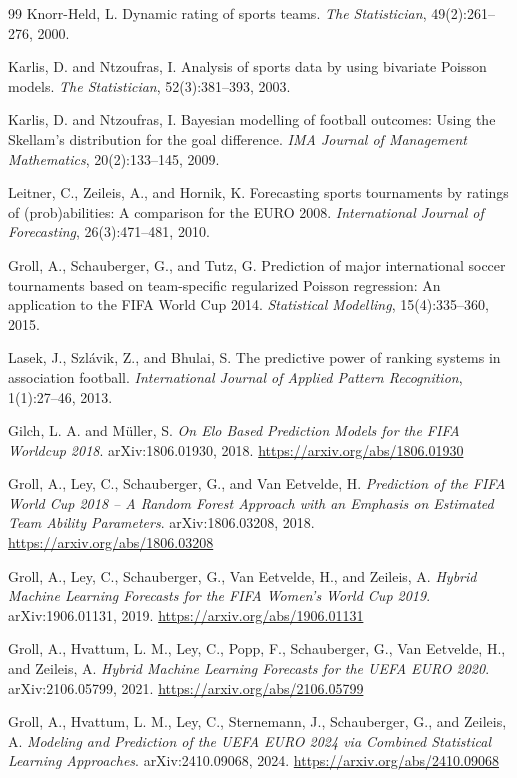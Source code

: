 \documentclass[11pt]{article}
\begin{document}
\begin{thebibliography}{99}
Knorr-Held, L. Dynamic rating of sports teams. \emph{The Statistician},
49(2):261--276, 2000.

Karlis, D. and Ntzoufras, I. Analysis of sports data by using bivariate Poisson
models. \emph{The Statistician}, 52(3):381--393, 2003.

Karlis, D. and Ntzoufras, I. Bayesian modelling of football outcomes: Using the
Skellam's distribution for the goal difference. \emph{IMA Journal of Management
Mathematics}, 20(2):133--145, 2009.

Leitner, C., Zeileis, A., and Hornik, K. Forecasting sports tournaments by
ratings of (prob)abilities: A comparison for the EURO 2008. \emph{International
Journal of Forecasting}, 26(3):471--481, 2010.

Groll, A., Schauberger, G., and Tutz, G. Prediction of major international
soccer tournaments based on team-specific regularized Poisson regression: An
application to the FIFA World Cup 2014. \emph{Statistical Modelling},
15(4):335--360, 2015.

Lasek, J., Szl\'avik, Z., and Bhulai, S. The predictive power of ranking systems
in association football. \emph{International Journal of Applied Pattern
Recognition}, 1(1):27--46, 2013.

Gilch, L. A. and M{\"u}ller, S. \emph{On Elo Based Prediction Models for the
FIFA Worldcup 2018}. arXiv:1806.01930, 2018.
\url{https://arxiv.org/abs/1806.01930}

Groll, A., Ley, C., Schauberger, G., and Van Eetvelde, H. \emph{Prediction of
the FIFA World Cup 2018 -- A Random Forest Approach with an Emphasis on
Estimated Team Ability Parameters}. arXiv:1806.03208, 2018.
\url{https://arxiv.org/abs/1806.03208}

Groll, A., Ley, C., Schauberger, G., Van Eetvelde, H., and Zeileis, A.
\emph{Hybrid Machine Learning Forecasts for the FIFA Women's World Cup 2019}.
arXiv:1906.01131, 2019.
\url{https://arxiv.org/abs/1906.01131}

Groll, A., Hvattum, L. M., Ley, C., Popp, F., Schauberger, G.,
Van Eetvelde, H., and Zeileis, A.
\emph{Hybrid Machine Learning Forecasts for the UEFA EURO 2020}.
arXiv:2106.05799, 2021.
\url{https://arxiv.org/abs/2106.05799}

Groll, A., Hvattum, L. M., Ley, C., Sternemann, J., Schauberger, G.,
and Zeileis, A.
\emph{Modeling and Prediction of the UEFA EURO 2024 via Combined Statistical
Learning Approaches}. arXiv:2410.09068, 2024.
\url{https://arxiv.org/abs/2410.09068}


\end{thebibliography}
\end{document}
